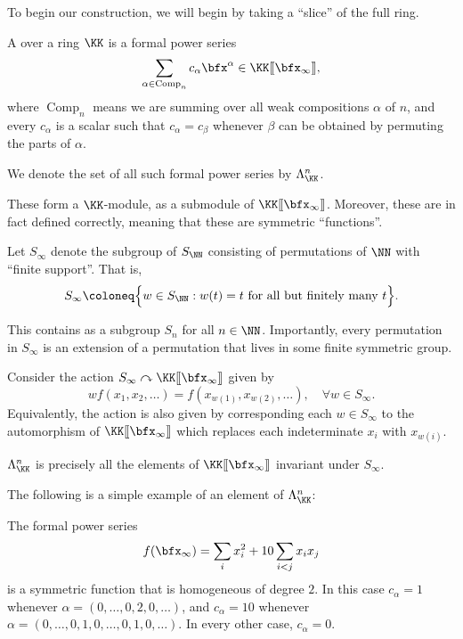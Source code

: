 \documentclass{article}
\newcommand{\fps}[2]{#1 [\kern-1.2pt[ {#2} ]\kern-1.2pt]}
\DeclareMathOperator{\Com}{Comp}
\begin{document}
To begin our construction, we will begin by taking a ``slice'' of the full ring.

\begin{definition}
    A  over a ring $\KK$ is a formal power series
    \[
        \sum_{\alpha \in \Com_n}
        c_\alpha \bfx^\alpha
        \in \fps{\KK}{\bfx_\infty},
    \]
    where $\Com_n$ means we are summing over all weak compositions $\alpha$ of $n$, and every $c_\alpha$ is a scalar such that $c_\alpha = c_\beta$ whenever $\beta$ can be obtained by permuting the parts of $\alpha$.
    
    We denote the set of all such formal power series by $\Lambda_\KK^n$.
\end{definition}

These form a $\KK$-module, as a submodule of $\fps{\KK}{\bfx_\infty}$.
Moreover, these are in fact defined correctly, meaning that these are symmetric ``functions''.

\begin{definition}
    Let $S_\infty$ denote the subgroup of $S_\NN$ consisting of permutations of $\NN$ with ``finite support''.
    That is,
    \[
        S_\infty
        \coloneq
        \Big\{
            w \in S_\NN: w(t) = t\text{ for all but finitely many }t
        \Big\}.
    \]
\end{definition}

This contains as a subgroup $S_n$ for all $n \in \NN$.
Importantly, every permutation in $S_\infty$ is an extension of a permutation that lives in some finite symmetric group.

\begin{remark}
    Consider the action $S_\infty \curvearrowright \fps{\KK}{\bfx_\infty}$ given by
    \[
        wf(x_1,x_2,\ldots)
        =
        f(x_{w(1)},x_{w(2)},\ldots), \quad \forall w \in S_\infty.
    \]
    Equivalently, the action is also given by corresponding each $w \in S_\infty$ to the automorphism of $\fps{\KK}{\bfx_\infty}$ which replaces each indeterminate $x_i$ with $x_{w(i)}$.

    $\Lambda_{\KK}^n$ is precisely all the elements of $\fps{\KK}{\bfx_\infty}$ invariant under $S_\infty$.
\end{remark}

The following is a simple example of an element of $\Lambda_\KK^n$:

\begin{example}
    The formal power series 
    \[
        f(\bfx_\infty)
        =
        \sum_i
        x_i^2 
        + 10\sum_{i < j}
        x_ix_j
    \]
    is a symmetric function that is homogeneous of degree $2$. In this case $c_\alpha = 1$ whenever $\alpha = (0,\ldots,0, 2, 0,\ldots)$, and $c_\alpha = 10$ whenever $\alpha = (0,\ldots, 0, 1, 0, \ldots, 0, 1, 0, \ldots)$.
    In every other case, $c_\alpha = 0$.
\end{example}
\end{document}
